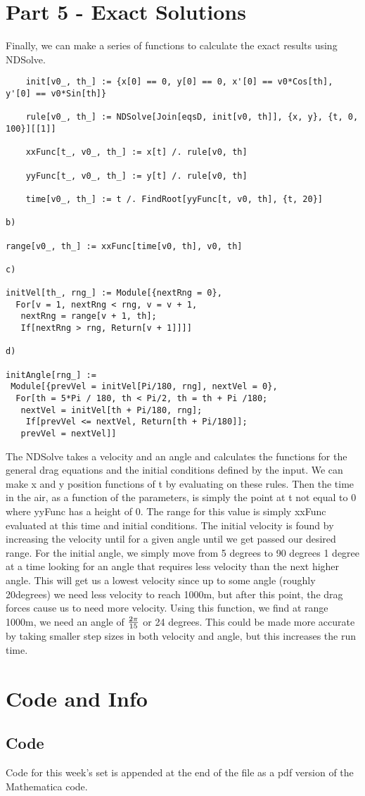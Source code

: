 \documentclass{article}
\begin{document}
\section{Part 5 - Exact Solutions}

Finally, we can make a series of functions to calculate the exact results using NDSolve.
\begin{verbatim}
	init[v0_, th_] := {x[0] == 0, y[0] == 0, x'[0] == v0*Cos[th], y'[0] == v0*Sin[th]}

	rule[v0_, th_] := NDSolve[Join[eqsD, init[v0, th]], {x, y}, {t, 0, 100}][[1]]

	xxFunc[t_, v0_, th_] := x[t] /. rule[v0, th]

	yyFunc[t_, v0_, th_] := y[t] /. rule[v0, th]

	time[v0_, th_] := t /. FindRoot[yyFunc[t, v0, th], {t, 20}]

b)

range[v0_, th_] := xxFunc[time[v0, th], v0, th]

c)

initVel[th_, rng_] := Module[{nextRng = 0},
  For[v = 1, nextRng < rng, v = v + 1, 
   nextRng = range[v + 1, th];
   If[nextRng > rng, Return[v + 1]]]]

d)

initAngle[rng_] := 
 Module[{prevVel = initVel[Pi/180, rng], nextVel = 0},
  For[th = 5*Pi / 180, th < Pi/2, th = th + Pi /180;
   nextVel = initVel[th + Pi/180, rng];
    If[prevVel <= nextVel, Return[th + Pi/180]];
   prevVel = nextVel]]
\end{verbatim}

The NDSolve takes a velocity and an angle and calculates the functions for the general drag equations and the initial conditions defined by the input.
We can make x and y position functions of t by evaluating on these rules. Then the time in the air, as a function of the parameters, is simply the point
at t not equal to 0 where yyFunc has a height of 0. The range for this value is simply xxFunc evaluated at this time and initial conditions. The initial
velocity is found by increasing the velocity until for a given angle until we get passed our desired range. For the initial angle, we simply move from
5 degrees to 90 degrees 1 degree at a time looking for an angle that requires less velocity than the next higher angle. This will get us a lowest velocity
since up to some angle (roughly 20degrees) we need less velocity to reach 1000m, but after this point, the drag forces cause us to need more velocity.
Using this function, we find at range 1000m, we need an angle of ${2 \pi \over 15}$ or 24 degrees. This could be made more accurate by taking smaller
step sizes in both velocity and angle, but this increases the run time.

\section{Code and Info}

\subsection{Code}
Code for this week's set is appended at the end of the file as a pdf version of the Mathematica code.

\end{document}
